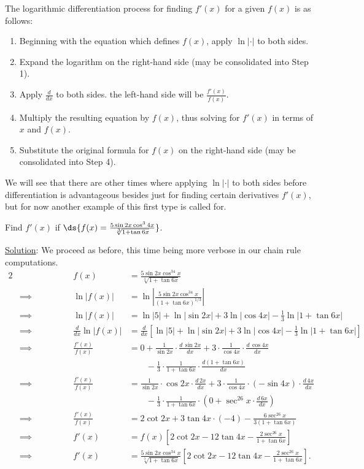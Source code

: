 The logarithmic differentiation process for finding $f'(x)$
for a given $f(x)$ is as follows:
\begin{enumerate}
\item Beginning with the equation which defines $f(x)$,
      apply $\ln|\cdot|$ to both sides.
\item Expand the logarithm on the right-hand side (may be 
      consolidated into Step 1).
\item Apply $\frac{d}{dx}$ to both sides.  the left-hand side
      will be $\frac{f'(x)}{f(x)}$.
\item Multiply the resulting equation by $f(x)$, thus
      solving for $f'(x)$ in terms of $x$ and $f(x)$.
\item Substitute the original formula for $f(x)$ on the 
      right-hand side (may be consolidated into Step 4).
\end{enumerate}

We will see that there are other times where 
applying $\ln|\cdot|$ to both sides before differentiation 
is advantageous besides just for finding certain
derivatives $f'(x)$, but for now another example of this
first type is called for.

\bex Find $f'(x)$ if $\ds{f(x)=\frac{5\sin2x\cos^34x}{\sqrt[3]{1+\tan6x}}}$.

\underline{Solution}: We proceed as before, this time being
more verbose in our chain rule computations.
\begin{alignat*}{2}
&&f(x)&=\frac{5\sin2x\cos^34x}{\sqrt[3]{1+\tan6x}}\\
&\implies\qquad\qquad
  &\ln|f(x)|&=\ln\left|\frac{5\sin2x\cos^34x}{(1+\tan6x)^{1/3}}\right|\\
&\implies
  &\ln|f(x)|&=\ln|5|+\ln|\sin2x|+3\ln|\cos 4x|-\frac13\ln|1+\tan6x|\\
&\implies&\frac{d}{dx}\ln|f(x)|&=\frac{d}{dx}\left[
            \ln|5|+\ln|\sin2x|+3\ln|\cos 4x|-\frac13\ln|1+\tan6x|\right]\\
&\implies&\frac{f'(x)}{f(x)}&=0+\frac1{\sin2x}\cdot\frac{d\,\sin2x}{dx}
            +3\cdot\frac{1}{\cos4x}\cdot\frac{d\,\cos4x}{dx}\\
            &&&\qquad-\frac13\cdot\frac1{1+\tan6x}\cdot\frac{d(1+\tan6x)}{dx}\\
&\implies&\frac{f'(x)}{f(x)}&=\frac1{\sin2x}\cdot\cos2x\cdot
          \frac{d\,2x}{dx}+
            3\cdot\frac1{\cos 4x}\cdot(-\sin4x)\cdot\frac{d\,4x}{dx}\\
       &&&\qquad    -\frac13\cdot\frac1{1+\tan6x}\cdot
            \left(0+\sec^26x\cdot\frac{d\,6x}{dx}\right)\\
&\implies&\frac{f'(x)}{f(x)}&=2\cot2x+3\tan4x\cdot(-4)
                  -\frac{6\sec^26x}{3(1+\tan6x)}\\
&\implies&f'(x)&=f(x)\left[2\cot2x-12\tan4x-\frac{2\sec^26x}{1+\tan6x}\right]\\
&\implies&f'(x)&=\frac{5\sin2x\cos^34x}{\sqrt[3]{1+\tan6x}}
      \left[2\cot2x-12\tan4x-\frac{2\sec^26x}{1+\tan6x}\right].
\end{alignat*}

